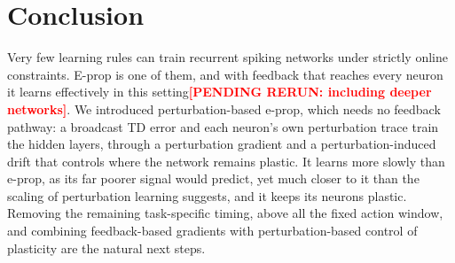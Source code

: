 \documentclass[10pt,twocolumn]{article}
\newcommand{\pending}[1]{\textcolor{red}{\bfseries[PENDING RERUN#1]}}
\newcommand{\method}{perturbation-based e-prop}   %
\begin{document}
\section{Conclusion}
\label{sec:conclusion}

Very few learning rules can train recurrent spiking networks under strictly online
constraints. E-prop is one of them, and with feedback that reaches every
neuron it learns effectively in this setting\pending{: including deeper networks}. We
introduced \method{}, which needs no feedback pathway: a broadcast TD error and each
neuron's own perturbation trace train the hidden layers, through a perturbation gradient
and a perturbation-induced drift that controls where the network remains plastic. It
learns more slowly than e-prop, as its far poorer signal would predict, yet much closer
to it than the scaling of perturbation learning suggests, and it keeps its neurons
plastic. Removing the remaining task-specific timing, above all the fixed action window,
and combining feedback-based gradients with perturbation-based control of plasticity are
the natural next steps.




\clearpage
\onecolumn
\appendix
\end{document}
